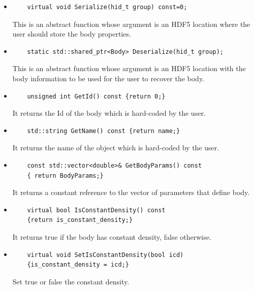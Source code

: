 \documentclass[3p,12pt]{elsarticle}
\begin{document}
\begin{itemize}
\item  
  \begin{lstlisting}
    virtual void Serialize(hid_t group) const=0;
  \end{lstlisting}
  This is an abstract function whose argument is an HDF5 location
  where the user should store the body properties.

  \item  
  \begin{lstlisting}
    static std::shared_ptr<Body> Deserialize(hid_t group);
  \end{lstlisting}
  This is an abstract function whose argument is an HDF5 location
  with the body information to be used for the user to recover the body.
  
\item  
  \begin{lstlisting}
    unsigned int GetId() const {return 0;}
  \end{lstlisting}
  It returns the Id of the body which is hard-coded by the user.

\item  
  \begin{lstlisting}
    std::string GetName() const {return name;}
  \end{lstlisting}
  It returns the name of the object which is hard-coded by the user.

\item  
  \begin{lstlisting}
    const std::vector<double>& GetBodyParams() const
    { return BodyParams;}
  \end{lstlisting}
  It returns a constant reference to the vector of parameters that define body. 
  
  \item  
  \begin{lstlisting}
    virtual bool IsConstantDensity() const
    {return is_constant_density;}
  \end{lstlisting}
  It returns true if the body has constant density, false otherwise.
  
\item  
  \begin{lstlisting}
    virtual void SetIsConstantDensity(bool icd)
    {is_constant_density = icd;}
  \end{lstlisting}
  Set true or false the constant density. 
\end{itemize}
\end{document}
